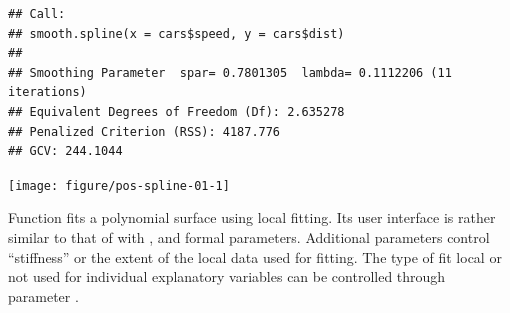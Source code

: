\documentclass[krantz2]{krantz}\usepackage{knitr}
\begin{document}
\begin{knitrout}\footnotesize
{}\color{fgcolor}\begin{kframe}
\begin{alltt}
 \hlkwb{<-} \hlstd{(} \hlopt{$}  \hlopt{$}
\end{alltt}
\begin{verbatim}
## Call:
## smooth.spline(x = cars$speed, y = cars$dist)
## 
## Smoothing Parameter  spar= 0.7801305  lambda= 0.1112206 (11 iterations)
## Equivalent Degrees of Freedom (Df): 2.635278
## Penalized Criterion (RSS): 4187.776
## GCV: 244.1044
\end{verbatim}
\begin{alltt}
  \hlstd{=} \hlstd{)}
\hlstd{(} \hlopt{$}  \hlopt{$}
\end{alltt}
\end{kframe}

{\centering \texttt{[image: figure/pos-spline-01-1]} 

}


\end{knitrout}

Function  fits a polynomial surface using local fitting. Its user interface is rather similar to that of  with ,  and  formal parameters. Additional parameters control ``stiffness'' or the extent of the local data used for fitting. The type of fit local or not used for individual explanatory variables can be controlled through parameter .
\end{document}
